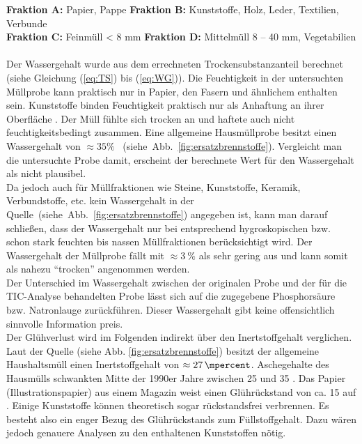 \FloatBarrier
{\footnotesize \textbf{Fraktion A:} Papier, Pappe \quad \quad \quad \hspace*{0.7mm} \textbf{Fraktion B:} Kunststoffe, Holz, Leder, Textilien, Verbunde}\\
{\footnotesize \textbf{Fraktion C:} Feinmüll < 8 mm \quad \quad \textbf{Fraktion D:} Mittelmüll 8 – 40 mm, Vegetabilien}\\ \\
Der Wassergehalt wurde aus dem errechneten Trockensubstanzanteil berechnet (siehe Gleichung (\ref{eq:TS}) bis (\ref{eq:WG})).
Die Feuchtigkeit in der untersuchten Müllprobe kann praktisch nur in Papier, den Fasern und ähnlichem enthalten sein. Kunststoffe binden Feuchtigkeit praktisch nur als Anhaftung an ihrer Oberfläche \cite[S.3]{LLA_Abfallanalyse}. Der Müll fühlte sich trocken an und haftete auch nicht feuchtigkeitsbedingt zusammen.
Eine allgemeine Hausmüllprobe besitzt einen Wassergehalt von \mbox{$\approx 35\%$ } \mbox{(siehe Abb. \ref{fig:ersatzbrennstoffe})}. Vergleicht man die untersuchte Probe damit, erscheint der berechnete Wert für den Wassergehalt als nicht plausibel. \\
Da jedoch auch für Müllfraktionen wie Steine, Kunststoffe, Keramik, Verbundstoffe, etc. kein Wassergehalt in der \mbox{Quelle (siehe Abb. \ref{fig:ersatzbrennstoffe})} angegeben ist, kann man darauf schließen, dass der Wassergehalt nur bei entsprechend hygroskopischen bzw. schon stark feuchten bis nassen Müllfraktionen berücksichtigt wird. Der Wassergehalt der Müllprobe fällt mit $\approx \SI{3}{\percent}$ als sehr gering aus und kann somit als nahezu "`trocken"' angenommen werden.\\
Der Unterschied im Wassergehalt zwischen der originalen Probe und der für die TIC-Analyse behandelten Probe lässt sich auf die zugegebene Phosphorsäure bzw. Natronlauge zurückführen. Dieser Wassergehalt gibt keine offensichtlich sinnvolle Information preis.\\
Der Glühverlust wird im Folgenden indirekt über den Inertstoffgehalt verglichen. Laut der Quelle (siehe Abb. \ref{fig:ersatzbrennstoffe}) besitzt der allgemeine Haushaltsmüll einen Inertstoffgehalt von $\approx \SI{27}{\mpercent}$. 
Aschegehalte des Hausmülls schwankten Mitte der 1990er Jahre zwischen \SI{25}{\mpercent} und \SI{35}{\mpercent} \cite{scholz2013}.
Das Papier (Illustrationspapier) aus einem Magazin weist einen Glührückstand von ca. \SI{15}{\mpercent} auf \cite{roempppap}. Einige Kunststoffe können theoretisch sogar rückstandsfrei verbrennen. Es besteht also ein enger Bezug des Glührückstands zum Füllstoffgehalt. Dazu wären jedoch genauere Analysen zu den enthaltenen Kunststoffen nötig.\\
